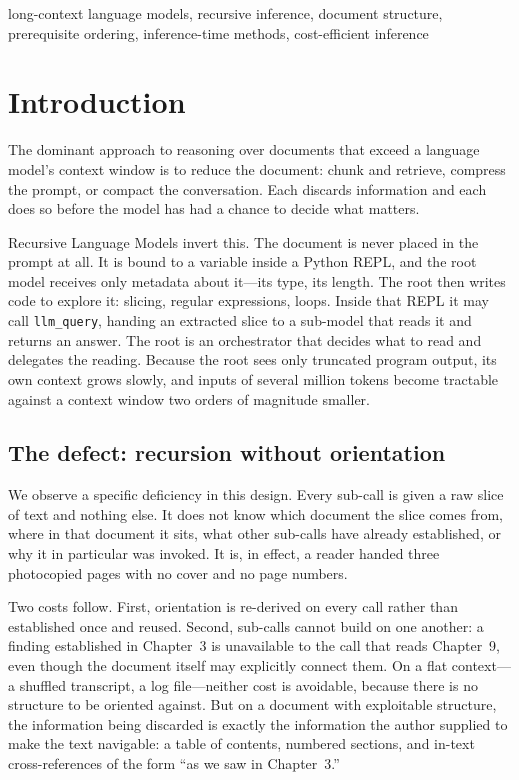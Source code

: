 \documentclass[conference]{IEEEtran}
\begin{document}
\begin{IEEEkeywords}
long-context language models, recursive inference, document structure,
prerequisite ordering, inference-time methods, cost-efficient inference
\end{IEEEkeywords}

\section{Introduction}
\label{sec:intro}
The dominant approach to reasoning over documents that exceed a language
model's context window is to reduce the document: chunk and retrieve,
compress the prompt, or compact the conversation. Each discards information
and each does so before the model has had a chance to decide what matters.

Recursive Language Models \cite{zhang2025rlm} invert this. The document is
never placed in the prompt at all. It is bound to a variable inside a Python
REPL, and the root model receives only metadata about it---its type, its
length. The root then writes code to explore it: slicing, regular
expressions, loops. Inside that REPL it may call \texttt{llm\_query}, handing
an extracted slice to a sub-model that reads it and returns an answer. The
root is an orchestrator that decides what to read and delegates the reading.
Because the root sees only truncated program output, its own context grows
slowly, and inputs of several million tokens become tractable against a
context window two orders of magnitude smaller.

\subsection{The defect: recursion without orientation}
\label{sec:gap}
We observe a specific deficiency in this design. Every sub-call is given a
raw slice of text and nothing else. It does not know which document the slice
comes from, where in that document it sits, what other sub-calls have already
established, or why it in particular was invoked. It is, in effect, a reader
handed three photocopied pages with no cover and no page numbers.

Two costs follow. First, orientation is re-derived on every call rather than
established once and reused. Second, sub-calls cannot build on one another:
a finding established in Chapter~3 is unavailable to the call that reads
Chapter~9, even though the document itself may explicitly connect them. On a
flat context---a shuffled transcript, a log file---neither cost is avoidable,
because there is no structure to be oriented against. But on a document with
exploitable structure, the information being discarded is exactly the
information the author supplied to make the text navigable: a table of
contents, numbered sections, and in-text cross-references of the form ``as we
saw in Chapter~3.''
\end{document}
